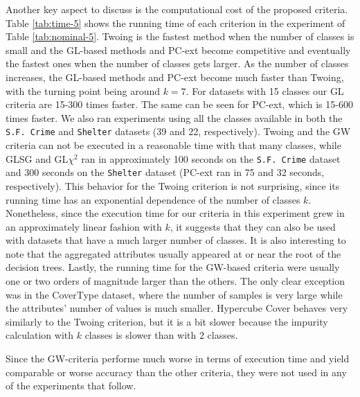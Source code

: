 Another key aspect to discuss is the computational cost of the proposed criteria. Table \ref{tab:time-5} shows the running time of each criterion in the experiment of Table \ref{tab:nominal-5}. Twoing is the fastest method when the number of classes is small and the GL-based methods  and PC-ext become competitive and eventually the fastest ones when the number of classes gets larger. As the number of classes increases, the GL-based methods and PC-ext become much faster than Twoing, with the turning point being around $k=7$. For datasets with 15 classes our GL criteria are 15-300 times faster. The same can be seen for PC-ext, which is 15-600 times faster. We also ran experiments using all the classes available in both the {\tt S.F. Crime} and {\tt Shelter} datasets (39 and 22, respectively). Twoing and the GW criteria can not be executed in a reasonable time with that many classes, while GLSG and GL$\chi^2$ ran in approximately 100 seconds on the {\tt S.F. Crime} dataset and  300 seconds on the {\tt Shelter} dataset (PC-ext ran in 75 and 32 seconds, respectively). This behavior for the Twoing criterion is not surprising, since its running time has an exponential dependence of the number of classes $k$. Nonetheless, since the execution time for our criteria in this experiment grew in an approximately linear fashion with $k$, it suggests that they can also be used with datasets that have a much larger number of classes. It is also interesting to note that the aggregated attributes usually appeared at or near the root of the decision trees. Lastly, the running time for the GW-based criteria were usually one or two orders of magnitude larger than the others. The only clear exception was in the CoverType dataset, where the number of samples is very large while the attributes’ number of values is much smaller. Hypercube Cover behaves very similarly to the Twoing criterion, but it is a bit slower because the impurity calculation with $k$ classes is slower than with $2$ classes.

Since the GW-criteria performe much worse in terms of execution time and yield comparable or worse accuracy than the other criteria, they were not used in any of the experiments that follow.

